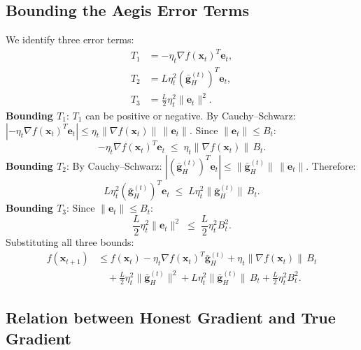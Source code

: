 \documentclass[../main]{subfiles}
\begin{document}
\subsection{Bounding the Aegis Error Terms}

We identify three error terms:
\begin{align*}
    T_1 &= -\eta_t \nabla f(\mathbf{x}_t)^T \mathbf{e}_t, \\
    T_2 &= L\eta_t^2 (\bar{\mathbf{g}}_H^{(t)})^T \mathbf{e}_t, \\
    T_3 &= \frac{L}{2}\eta_t^2 \|\mathbf{e}_t\|^2.
\end{align*}
\textbf{Bounding $T_1$}:
$T_1$ can be positive or negative. By Cauchy--Schwarz:
$|-\eta_t \nabla f(\mathbf{x}_t)^T \mathbf{e}_t| \leq \eta_t\|\nabla f(\mathbf{x}_t)\|\,\|\mathbf{e}_t\|$.
Since $\|\mathbf{e}_t\| \leq B_t$:
\begin{equation}
    -\eta_t \nabla f(\mathbf{x}_t)^T \mathbf{e}_t \;\leq\; \eta_t\|\nabla f(\mathbf{x}_t)\|\, B_t.
    \label{eq:T1_bound}
\end{equation}
\textbf{Bounding $T_2$}:
By Cauchy--Schwarz: $|(\bar{\mathbf{g}}_H^{(t)})^T \mathbf{e}_t| \leq \|\bar{\mathbf{g}}_H^{(t)}\|\,\|\mathbf{e}_t\|$.
Therefore:
\begin{equation}
    L\eta_t^2(\bar{\mathbf{g}}_H^{(t)})^T \mathbf{e}_t \;\leq\; L\eta_t^2\|\bar{\mathbf{g}}_H^{(t)}\|\, B_t.
    \label{eq:T2_bound}
\end{equation}
\textbf{Bounding $T_3$}:
Since $\|\mathbf{e}_t\| \leq B_t$:
\begin{equation}
    \frac{L}{2}\eta_t^2\|\mathbf{e}_t\|^2 \;\leq\; \frac{L}{2}\eta_t^2 B_t^2.
    \label{eq:T3_bound}
\end{equation}
Substituting all three bounds:
\begin{equation}
\boxed{
\begin{aligned}
    f(\mathbf{x}_{t+1}) &\leq f(\mathbf{x}_t) - \eta_t \nabla f(\mathbf{x}_t)^T \bar{\mathbf{g}}_H^{(t)}
    + \eta_t\|\nabla f(\mathbf{x}_t)\|\, B_t \\
    &\quad + \frac{L}{2}\eta_t^2\|\bar{\mathbf{g}}_H^{(t)}\|^2
    + L\eta_t^2\|\bar{\mathbf{g}}_H^{(t)}\|\, B_t
    + \frac{L}{2}\eta_t^2 B_t^2.
\end{aligned}
}
    \label{eq:all_bounds}
\end{equation}
\subsection{Relation between Honest Gradient and True Gradient}
\end{document}
